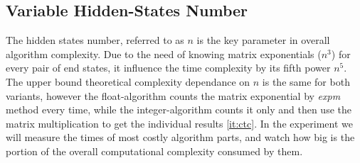 \documentclass[thesis=M,english]{FITthesis}[2012/10/20]
\begin{document}
\subsection{Variable Hidden-States Number}

The hidden states number, referred to as $n$ is the key parameter in overall algorithm complexity. Due to the need of knowing matrix exponentials ($n^3$) for every pair of end states, it influence the time complexity by its fifth power $n^5$. The upper bound theoretical complexity dependance on $n$ is the same for both variants, however the float-algorithm counts the matrix exponential by \textit{expm} method every time, while the integer-algorithm counts it only and then use the matrix multiplication to get the individual results \ref{it:ctc}. In the experiment we will measure the times of most costly algorithm parts, and watch how big is the portion of the overall computational complexity consumed by them. 
\end{document}
